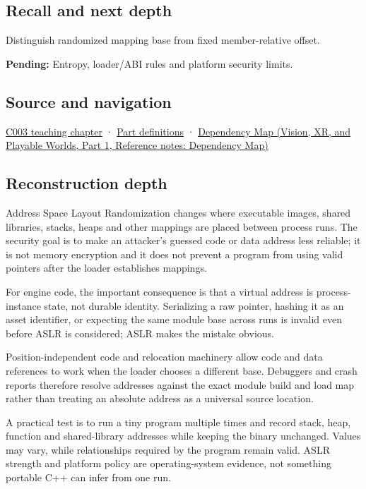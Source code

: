 \subsection{Recall and next depth}\label{appendix-78cb248c8355-recall-and-next-depth}

\hypertarget{appendix-78cb248c8355-recall-and-next-depth}{}

Distinguish randomized mapping base from fixed member-relative offset.

\textbf{Pending:} Entropy, loader/ABI rules and platform security limits.

\subsection{Source and navigation}\label{appendix-78cb248c8355-source-and-navigation}

\hypertarget{appendix-78cb248c8355-source-and-navigation}{}

\hyperref[01-foundations-i-ch002-where-the-bytes-live]{C003 teaching chapter} · \hyperref[appendix-fd090d982a15-m003---parts-41-60]{Part definitions} · \href{../07-Vision-XR-and-Playable-Worlds-P01/main.pdf\#nameddest=appendix-4ad47bdd269a}{Dependency Map (Vision, XR, and Playable Worlds, Part 1, Reference notes: Dependency Map)}

\subsection{Reconstruction depth}\label{appendix-78cb248c8355-reconstruction-depth}

\hypertarget{appendix-78cb248c8355-reconstruction-depth}{}

Address Space Layout Randomization changes where executable images, shared libraries, stacks, heaps and other mappings are placed between process runs. The security goal is to make an attacker's guessed code or data address less reliable; it is not memory encryption and it does not prevent a program from using valid pointers after the loader establishes mappings.

For engine code, the important consequence is that a virtual address is process-instance state, not durable identity. Serializing a raw pointer, hashing it as an asset identifier, or expecting the same module base across runs is invalid even before ASLR is considered; ASLR makes the mistake obvious.

Position-independent code and relocation machinery allow code and data references to work when the loader chooses a different base. Debuggers and crash reports therefore resolve addresses against the exact module build and load map rather than treating an absolute address as a universal source location.

A practical test is to run a tiny program multiple times and record stack, heap, function and shared-library addresses while keeping the binary unchanged. Values may vary, while relationships required by the program remain valid. ASLR strength and platform policy are operating-system evidence, not something portable C++ can infer from one run.
